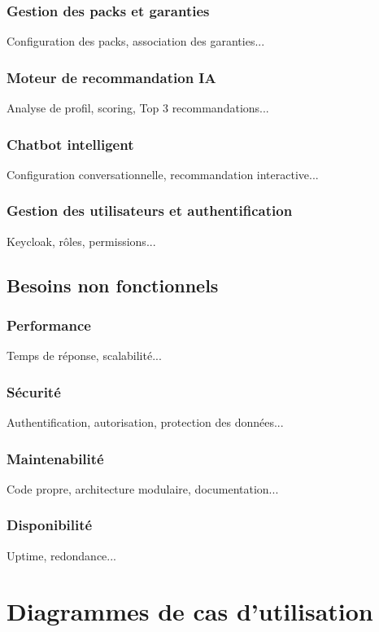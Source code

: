 \documentclass[12pt,a4paper]{report}
\begin{document}
\subsubsection{Gestion des packs et garanties}
Configuration des packs, association des garanties...

\subsubsection{Moteur de recommandation IA}
Analyse de profil, scoring, Top 3 recommandations...

\subsubsection{Chatbot intelligent}
Configuration conversationnelle, recommandation interactive...

\subsubsection{Gestion des utilisateurs et authentification}
Keycloak, rôles, permissions...

\subsection{Besoins non fonctionnels}
\subsubsection{Performance}
Temps de réponse, scalabilité...

\subsubsection{Sécurité}
Authentification, autorisation, protection des données...

\subsubsection{Maintenabilité}
Code propre, architecture modulaire, documentation...

\subsubsection{Disponibilité}
Uptime, redondance...

\section{Diagrammes de cas d'utilisation}
\end{document}
